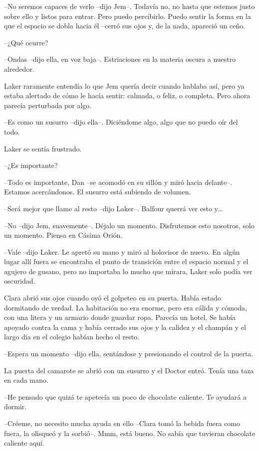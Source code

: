 {--No seremos capaces de verlo --dijo Jem--. Todavía no, no hasta que
 estemos justo sobre ello y listos para entrar. Pero puedo percibirlo.
 Puedo sentir la forma en la que el espacio se dobla hacia él --cerró sus
ojos y, de la nada, apareció un ceño.}

{--¿Qué ocurre?}

{--Ondas --dijo ella, en voz baja--. Estriaciones en la materia oscura a
nuestro alrededor.}

{Laker raramente entendía lo que Jem quería decir cuando hablaba así,
 pero ya estaba alertado de cómo le hacía sentir: calmada, o feliz, o
completa. Pero ahora parecía perturbada por algo.}

{--Es como un susurro --dijo ella--. Diciéndome algo, algo que no puedo
oír del todo.}

{Laker se sentía frustrado.}

{--¿Es importante?}

{--Todo es importante, Dan --se acomodó en su sillón y miró hacia
delante--. Estamos acercándonos. El susurro está subiendo de volumen.}

{--Será mejor que llame al resto --dijo Laker--. Balfour querrá ver esto
 y\ldots{}}

{--No --dijo Jem, suavemente--. Déjalo un momento. Disfrutemos esto
nosotros, solo un momento. Piensa en Cásima Orión.}

{--Vale --dijo Laker. Le apretó su mano y miró al holovisor de nuevo. En
 algún lugar allí fuera se encontraba el punto de transición entre el
 espacio normal y el agujero de gusano, pero no importaba lo mucho que
 mirara, Laker solo podía ver oscuridad.}

{Clara abrió sus
 ojos cuando oyó el golpeteo en su puerta. Había estado dormitando de
 verdad. La habitación no era enorme, pero era cálida y cómoda, con una
 litera y un armario donde guardar ropa. Parecía un hotel. Se había
 apoyado contra la cama y había cerrado sus ojos y la calidez y el
champán y el largo día en el colegio habían hecho el resto.}

{--Espera un momento --dijo ella, sentándose y presionando el control de
la puerta.}

{La puerta del camarote se abrió con un susurro y el Doctor entró. Tenía
una taza en cada mano.}

{--He pensado que quizá te apetecía un poco de chocolate caliente. Te
ayudará a dormir.}

{--Créeme, no necesito mucha ayuda en ello --Clara tomó la bebida fuera
 como fuera, la olisqueó y la sorbió--. Mmm, está bueno. No sabía que
tuvieran chocolate caliente aquí.}

